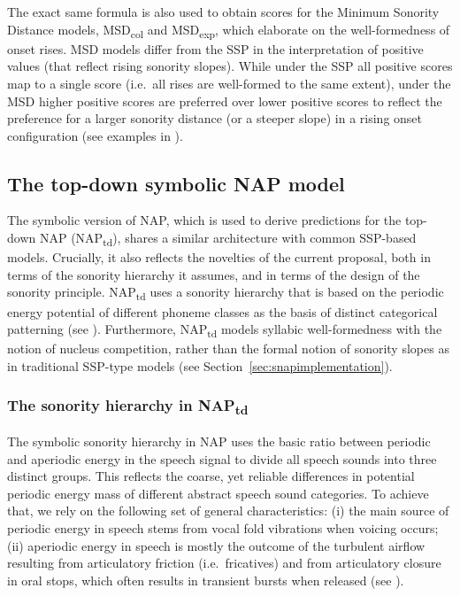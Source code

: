The exact same formula is also used to obtain scores for the Minimum Sonority Distance models, MSD\textsubscript{col} and MSD\textsubscript{exp}, which elaborate on the well-formedness of onset rises.
MSD models differ from the SSP in the interpretation of positive values (that reflect rising sonority slopes). While under the SSP all positive scores map to a single score (i.e.~all rises are well-formed to the same extent), under the MSD higher positive scores are preferred over lower positive scores to reflect the preference for a larger sonority distance (or a steeper slope) in a rising onset configuration (see examples in ).

\subsection{The top-down symbolic NAP model}\label{sec:naptdmodel}

The symbolic version of NAP, which is used to derive predictions for the top-down NAP (NAP\textsubscript{td}), shares a similar architecture with common SSP-based models. Crucially, it also reflects the novelties of the current proposal, both in terms of the sonority hierarchy it assumes, and in terms of the design of the sonority principle. NAP\textsubscript{td} uses a sonority hierarchy that is based on the periodic energy potential of different phoneme classes as the basis of distinct categorical patterning (see ). Furthermore, NAP\textsubscript{td} models syllabic well-formedness with the notion of nucleus competition, rather than the formal notion of sonority slopes as in traditional SSP-type models (see Section~\ref{sec:snapimplementation}).

\subsubsection{\texorpdfstring{The sonority hierarchy in NAP\textsubscript{td}}{The sonority hierarchy in NAPtd}}\label{sec:snaphierarchy}

The symbolic sonority hierarchy in NAP uses the basic ratio between periodic and aperiodic energy in the speech signal to divide all speech sounds into three distinct groups. This reflects the coarse, yet reliable differences in potential periodic energy mass of different abstract speech sound categories. To achieve that, we rely on the following set of general characteristics: (i) the main source of periodic energy in speech stems from vocal fold vibrations when voicing occurs; (ii) aperiodic energy in speech is mostly the outcome of the turbulent airflow resulting from articulatory friction (i.e.~fricatives) and from articulatory closure in oral stops, which often results in transient bursts when released (see \citealt{rosen1992temporal}).

